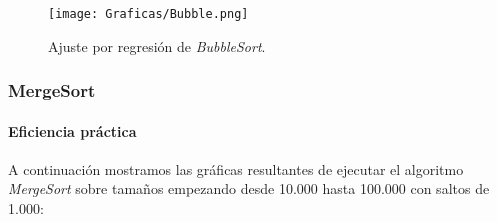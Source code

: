 \documentclass[a4paper,12pt]{article} %
\begin{document}
\begin{figure}[H]
	\centering
	\texttt{[image: Graficas/Bubble.png]}
	\caption{Ajuste por regresión de \textit{BubbleSort}.}
\end{figure}


\subsubsection{MergeSort}
\paragraph{Eficiencia práctica}

A continuación mostramos las gráficas resultantes de ejecutar el algoritmo \textit{MergeSort}
sobre tamaños empezando desde 10.000 hasta 100.000 con saltos de 1.000:
\end{document}
